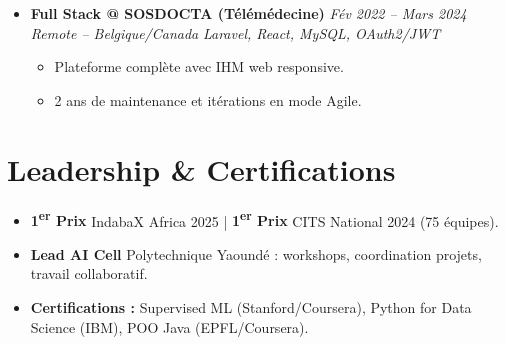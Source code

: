 \documentclass[a4paper,11pt]{article}
\begin{document}
\begin{itemize}[leftmargin=*, label={-}]
\item \textbf{Full Stack @ SOSDOCTA (Télémédecine)} \hfill \textit{Fév 2022 -- Mars 2024} \\
\textit{Remote -- Belgique/Canada} \hfill \textit{Laravel, React, MySQL, OAuth2/JWT}
\vspace{-2pt}
    \begin{itemize}[leftmargin=0.4cm, nosep, label=\tiny$\bullet$]
        \item \small{Plateforme complète avec IHM web responsive.}
        \item \small{2 ans de maintenance et itérations en mode Agile.}
    \end{itemize}
\vspace{3pt}

\end{itemize}

\section{Leadership \& Certifications}
\begin{itemize}[leftmargin=*, label=\tiny$\bullet$, nosep]
    \item \small{\textbf{1\textsuperscript{er} Prix} IndabaX Africa 2025 | \textbf{1\textsuperscript{er} Prix} CITS National 2024 (75 équipes).}
    \item \small{\textbf{Lead AI Cell} Polytechnique Yaoundé : workshops, coordination projets, travail collaboratif.}
    \item \small{\textbf{Certifications :} Supervised ML (Stanford/Coursera), Python for Data Science (IBM), POO Java (EPFL/Coursera).}
\end{itemize}
\end{document}
